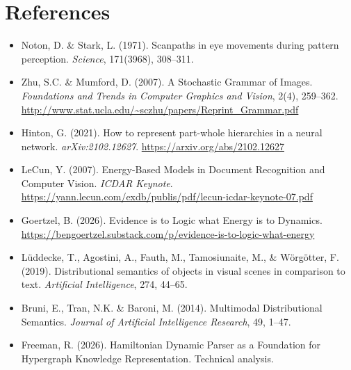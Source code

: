 \documentclass[11pt,a4paper]{article}
\begin{document}
\vfill

\section*{References}

\begin{itemize}
    \item Noton, D. \& Stark, L. (1971). Scanpaths in eye movements during pattern perception. \textit{Science}, 171(3968), 308--311.
    \item Zhu, S.C. \& Mumford, D. (2007). A Stochastic Grammar of Images. \textit{Foundations and Trends in Computer Graphics and Vision}, 2(4), 259--362. \url{http://www.stat.ucla.edu/~sczhu/papers/Reprint_Grammar.pdf}
    \item Hinton, G. (2021). How to represent part-whole hierarchies in a neural network. \textit{arXiv:2102.12627}. \url{https://arxiv.org/abs/2102.12627}
    \item LeCun, Y. (2007). Energy-Based Models in Document Recognition and Computer Vision. \textit{ICDAR Keynote}. \url{https://yann.lecun.com/exdb/publis/pdf/lecun-icdar-keynote-07.pdf}
    \item Goertzel, B. (2026). Evidence is to Logic what Energy is to Dynamics. \url{https://bengoertzel.substack.com/p/evidence-is-to-logic-what-energy}
    \item L\"{u}ddecke, T., Agostini, A., Fauth, M., Tamosiunaite, M., \& W\"{o}rg\"{o}tter, F. (2019). Distributional semantics of objects in visual scenes in comparison to text. \textit{Artificial Intelligence}, 274, 44--65.
    \item Bruni, E., Tran, N.K. \& Baroni, M. (2014). Multimodal Distributional Semantics. \textit{Journal of Artificial Intelligence Research}, 49, 1--47.
    \item Freeman, R. (2026). Hamiltonian Dynamic Parser as a Foundation for Hypergraph Knowledge Representation. Technical analysis.
\end{itemize}
\end{document}
